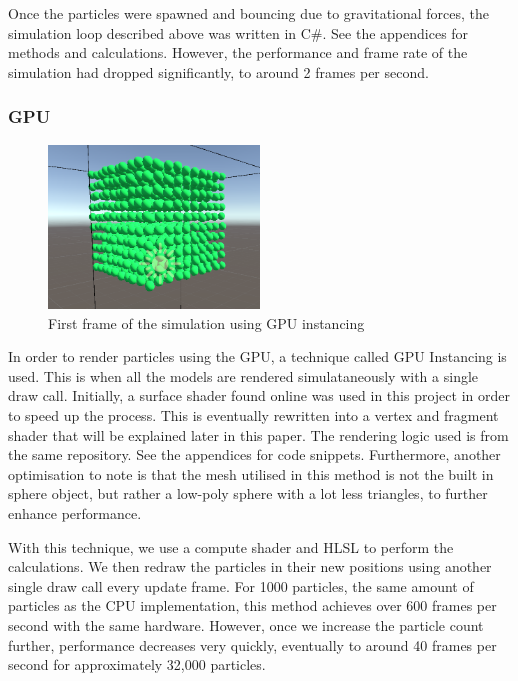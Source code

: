 \documentclass[12pt]{article}
\begin{document}
    Once the particles were spawned and bouncing due to gravitational forces, the simulation loop described above was written in C\#. See the appendices for methods and calculations. However, the performance and frame rate of the simulation had dropped significantly, to around 2 frames per second.

    \subsubsection{GPU}

    \begin{figure}[H]
        \begin{center}
            \includegraphics[width=0.5\textwidth]{firstFrameGPU.png}
            \caption{First frame of the simulation using GPU instancing}
        \end{center}
    \end{figure}

    In order to render particles using the GPU, a technique called GPU Instancing is used. This is when all the models are rendered simulataneously with a single draw call. Initially, a surface shader found online was used in this project in order to speed up the process\cite{gpuinstanceshader}. This is eventually rewritten into a vertex and fragment shader that will be explained later in this paper. The rendering logic used is from the same repository. See the appendices for code snippets. Furthermore, another optimisation to note is that the mesh utilised in this method is not the built in sphere object, but rather a low-poly sphere with a lot less triangles, to further enhance performance.

    With this technique, we use a compute shader and HLSL to perform the calculations. We then redraw the particles in their new positions using another single draw call every update frame. For 1000 particles, the same amount of particles as the CPU implementation, this method achieves over 600 frames per second with the same hardware. However, once we increase the particle count further, performance decreases very quickly, eventually to around 40 frames per second for approximately 32,000 particles.
\end{document}
